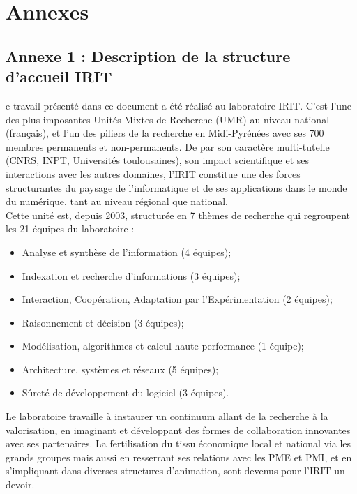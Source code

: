 %
%

\chapter{Annexes}
\label{chap:annex}

\section{Annexe 1 : Description de la structure d'accueil IRIT}
e travail présenté dans ce document a été réalisé au laboratoire \ac{IRIT}. C'est l'une des plus imposantes Unités Mixtes de Recherche (UMR) au niveau national (français), et l’un des piliers de la recherche en Midi-Pyrénées avec ses 700 membres permanents et non-permanents. De par son caractère multi-tutelle (CNRS, \acs{INPT}, Universités toulousaines), son impact scientifique et ses interactions avec les autres domaines, l'IRIT constitue une des forces structurantes du paysage de l’informatique et de ses applications dans le monde du numérique, tant au niveau régional que national.\\
Cette unité est, depuis 2003, structurée en 7 thèmes de recherche qui regroupent les 21 équipes du laboratoire :
\begin{itemize}[label=]
    \item Analyse et synthèse de l’information (4 équipes);
    \item Indexation et recherche d’informations (3 équipes);
    \item Interaction, Coopération, Adaptation par l’Expérimentation (2 équipes);
    \item Raisonnement et décision (3 équipes);
    \item Modélisation, algorithmes et calcul haute performance (1 équipe);
    \item Architecture, systèmes et réseaux (5 équipes);
    \item Sûreté de développement du logiciel (3 équipes).
\end{itemize}

\noindent Le laboratoire travaille à instaurer un continuum allant de la recherche à la valorisation, en imaginant et développant des formes de collaboration innovantes avec ses partenaires. La fertilisation du tissu économique local et national via les grands groupes mais aussi en resserrant ses relations avec les PME et PMI, et en s'impliquant dans diverses structures d’animation, sont devenus pour l’IRIT un devoir.

